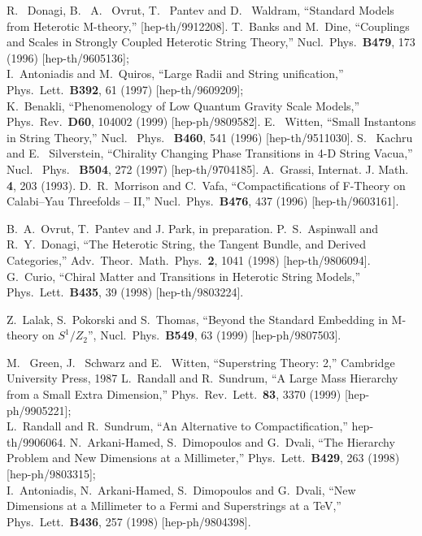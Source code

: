 \documentclass[a4paper,12pt]{article}
\numberwithin{equation}{section}
\theoremstyle{plain}
\begin{document}
\begin{thebibliography}{99}
   R. ~Donagi, B. ~A. ~Ovrut, T. ~Pantev and D. ~Waldram,
   ``Standard Models from Heterotic M-theory,''
   [hep-th/9912208].
   T.~Banks and M.~Dine,
   ``Couplings and Scales in Strongly Coupled Heterotic String Theory,''
   Nucl.\ Phys.\  {\bf B479}, 173 (1996)
   [hep-th/9605136];
   \\
   I.~Antoniadis and M.~Quiros,
   ``Large Radii and String unification,''
   Phys.\ Lett.\  {\bf B392}, 61 (1997)
   [hep-th/9609209];
   \\
   K.~Benakli,
   ``Phenomenology of Low Quantum Gravity Scale Models,''
   Phys.\ Rev.\  {\bf D60}, 104002 (1999)
   [hep-ph/9809582].
   E. ~Witten, ``Small Instantons in String Theory,''
   Nucl. \ Phys. \ {\bf B460}, 541 (1996)
   [hep-th/9511030].
   S. ~Kachru and E. ~Silverstein, ``Chirality Changing Phase Transitions
   in 4-D String Vacua,''
   Nucl. \ Phys. \ {\bf B504}, 272 (1997)
   [hep-th/9704185].
   A.~Grassi,
   Internat. J. Math. {\bf 4}, 203 (1993).
   D.~R.~Morrison and C.~Vafa,
   ``Compactifications of F-Theory on Calabi--Yau Threefolds -- II,''
   Nucl.\ Phys.\  {\bf B476}, 437 (1996)
   [hep-th/9603161].

   B.~A.~Ovrut, T.~Pantev and J. Park,
   in preparation. 
   P.~S.~Aspinwall and R.~Y.~Donagi,
   ``The Heterotic String, the Tangent Bundle, and Derived Categories,''
   Adv.\ Theor.\ Math.\ Phys.\  {\bf 2}, 1041 (1998)
   [hep-th/9806094].
   G.~Curio,
   ``Chiral Matter and Transitions in Heterotic String Models,''
   Phys.\ Lett.\  {\bf B435}, 39 (1998)
   [hep-th/9803224].

   Z.~Lalak, S.~Pokorski and S.~Thomas,
   ``Beyond the Standard Embedding in M-theory on $S^{1}/Z_{2}$'',
   Nucl.\ Phys.\  {\bf B549}, 63 (1999)
   [hep-ph/9807503].


   M. ~Green, J. ~Schwarz and E. ~Witten, ``Superstring Theory: 2,''
   Cambridge University Press, 1987
   L.~Randall and R.~Sundrum,
   ``A Large Mass Hierarchy from a Small Extra Dimension,''
   Phys.\ Rev.\ Lett.\  {\bf 83}, 3370 (1999)
   [hep-ph/9905221];
   \\
   L.~Randall and R.~Sundrum,
   ``An Alternative to Compactification,''
   hep-th/9906064.
   N.~Arkani-Hamed, S.~Dimopoulos and G.~Dvali,
   ``The Hierarchy Problem and New Dimensions at a Millimeter,''
   Phys.\ Lett.\  {\bf B429}, 263 (1998)
   [hep-ph/9803315];
   \\
   I.~Antoniadis, N.~Arkani-Hamed, S.~Dimopoulos and G.~Dvali,
   ``New Dimensions at a Millimeter to a Fermi and Superstrings at a TeV,''
   Phys.\ Lett.\  {\bf B436}, 257 (1998)
   [hep-ph/9804398].



\end{thebibliography}
\end{document}
